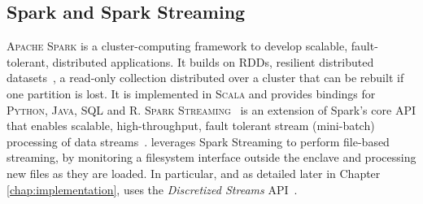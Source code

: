 \subsection{Spark and Spark Streaming}
\textsc{Apache Spark} is a cluster-computing framework to develop scalable, fault-tolerant, distributed applications. 
It builds on RDDs, resilient distributed datasets~\cite{McKeen2013}, a read-only collection distributed over a cluster that can be rebuilt if one partition is lost. 
It is implemented in \textsc{Scala} and provides bindings for \textsc{Python}, \textsc{Java}, \textsc{SQL} and \textsc{R}. 
\textsc{Spark Streaming}~\cite{Zaharia2012} is an extension of Spark's core API that enables scalable, high-throughput, fault tolerant stream (mini-batch) processing of data streams~\cite{ZahariaDStreams2012}.
\projName leverages Spark Streaming to perform file-based streaming, by monitoring a filesystem interface outside the enclave and processing new files as they are loaded.
In particular, and as detailed later in Chapter \ref{chap:implementation}, \projName uses the \textit{Discretized Streams} API~\cite{spark-streaming-documentation}.

